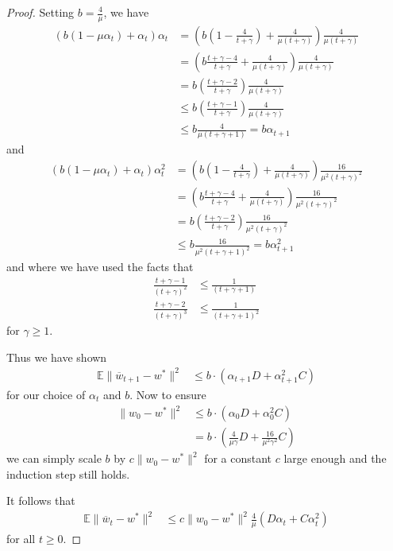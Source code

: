 \begin{proof}
		Setting $b=\frac{4}{\mu}$, we have 
		\begin{align*}
		(b(1-\mu\alpha_{t})+\alpha_{t})\alpha_{t} & =\left(b(1-\frac{4}{t+\gamma})+\frac{4}{\mu(t+\gamma)}\right)\frac{4}{\mu(t+\gamma)}\\
		& =\left(b\frac{t+\gamma-4}{t+\gamma}+\frac{4}{\mu(t+\gamma)}\right)\frac{4}{\mu(t+\gamma)}\\
		& =b(\frac{t+\gamma-2}{t+\gamma})\frac{4}{\mu(t+\gamma)}\\
		& \leq b(\frac{t+\gamma-1}{t+\gamma})\frac{4}{\mu(t+\gamma)}\\
		& \leq b\frac{4}{\mu(t+\gamma+1)}=b\alpha_{t+1}
		\end{align*}
		and 
		\begin{align*}
		(b(1-\mu\alpha_{t})+\alpha_{t})\alpha_{t}^{2} & =\left(b(1-\frac{4}{t+\gamma})+\frac{4}{\mu(t+\gamma)}\right)\frac{16}{\mu^{2}(t+\gamma)^{2}}\\
		& =\left(b\frac{t+\gamma-4}{t+\gamma}+\frac{4}{\mu(t+\gamma)}\right)\frac{16}{\mu^{2}(t+\gamma)^{2}}\\
		& =b(\frac{t+\gamma-2}{t+\gamma})\frac{16}{\mu^{2}(t+\gamma)^{2}}\\
		& \leq b\frac{16}{\mu^{2}(t+\gamma+1)^{2}}=b\alpha_{t+1}^{2}
		\end{align*}
		and where we have used the facts that 
		\begin{align*}
		\frac{t+\gamma-1}{(t+\gamma)^{2}} & \leq\frac{1}{(t+\gamma+1)}\\
		\frac{t+\gamma-2}{(t+\gamma)^{3}} & \leq\frac{1}{(t+\gamma+1)^{2}}
		\end{align*}
		for $\gamma\geq1$.
		
		Thus we have shown 
		\begin{align*}
		\mathbb{E}\|\overline{w}_{t+1}-w^{\ast}\|^{2} & \leq b\cdot(\alpha_{t+1}D+\alpha_{t+1}^{2}C)
		\end{align*}
		for our choice of $\alpha_{t}$ and $b$. Now to ensure 
		\begin{align*}
		\|w_{0}-w^{\ast}\|^{2} & \leq b\cdot(\alpha_{0}D+\alpha_{0}^{2}C)\\
		& =b\cdot(\frac{4}{\mu\gamma}D+\frac{16}{\mu^{2}\gamma^{2}}C)
		\end{align*}
		we can simply scale $b$ by $c\|w_{0}-w^{\ast}\|^{2}$ for a constant
		$c$ large enough and the induction step still holds. 
		
		It follows that 
		\begin{align*}
		\mathbb{E}\|\overline{w}_{t}-w^{\ast}\|^{2} & \leq c\|w_{0}-w^{\ast}\|^{2}\frac{4}{\mu}(D\alpha_{t}+C\alpha_{t}^{2})
		\end{align*}
		for all $t\geq0$. 
		

\end{proof}
